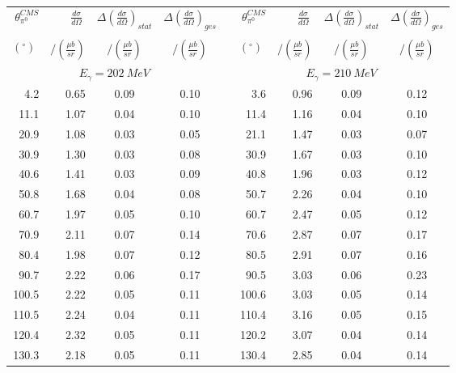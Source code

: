 \begin{table}[htbp] 
\begin{center} 
\begin{tabular}{|r|r|c|c|l|r|r|c|c|} 

\cline{1-4}
\cline{6-9} 
$\theta_{\pi^0}^{CMS}$ & 
$\displaystyle\frac{d\sigma}{d\Omega}\;$ & 
${\Delta}\left( \frac{d\sigma}{d\Omega}\right)_{stat}$ & 
${\Delta}\left( \frac{d\sigma}{d\Omega}\right)_{ges}$ & & 
$\theta_{\pi^0}^{CMS}$ & 
$\displaystyle\frac{d\sigma}{d\Omega}\;$ & 
${\Delta}\left( \frac{d\sigma}{d\Omega}\right)_{stat}$ & 
${\Delta}\left( \frac{d\sigma}{d\Omega}\right)_{ges}$ \\ 
& & & & & & & &\\ 
 $(^{\circ})\;$ & $/(\frac{{\mu}b}{sr})$ & $/(\frac{{\mu}b}{sr})$ & $/(\frac{{\mu}b}{sr})$ & & $(^{\circ})\;$ & $/(\frac{{\mu}b}{sr})$ & $/(\frac{{\mu}b}{sr})$ & $/(\frac{{\mu}b}{sr})$ \\ 
\cline{1-4} 
\cline{6-9} 
\multicolumn{4}{|c|}{ $E_{\gamma}=202~MeV$} & & 
\multicolumn{4}{c|}{ $E_{\gamma}=210~MeV$} \\ 
\cline{1-4} 
\cline{6-9} 
  4.2 &  0.65 &  0.09 &  0.10 & &   3.6 &  0.96 &  0.09 &  0.12 \\ 
 11.1 &  1.07 &  0.04 &  0.10 & &  11.4 &  1.16 &  0.04 &  0.10 \\ 
 20.9 &  1.08 &  0.03 &  0.05 & &  21.1 &  1.47 &  0.03 &  0.07 \\ 
 30.9 &  1.30 &  0.03 &  0.08 & &  30.9 &  1.67 &  0.03 &  0.10 \\ 
 40.6 &  1.41 &  0.03 &  0.09 & &  40.8 &  1.96 &  0.03 &  0.12 \\ 
 50.8 &  1.68 &  0.04 &  0.08 & &  50.7 &  2.26 &  0.04 &  0.10 \\ 
 60.7 &  1.97 &  0.05 &  0.10 & &  60.7 &  2.47 &  0.05 &  0.12 \\ 
 70.9 &  2.11 &  0.07 &  0.14 & &  70.6 &  2.87 &  0.07 &  0.17 \\ 
 80.4 &  1.98 &  0.07 &  0.12 & &  80.5 &  2.91 &  0.07 &  0.16 \\ 
 90.7 &  2.22 &  0.06 &  0.17 & &  90.5 &  3.03 &  0.06 &  0.23 \\ 
100.5 &  2.22 &  0.05 &  0.11 & & 100.6 &  3.03 &  0.05 &  0.14 \\ 
110.5 &  2.24 &  0.04 &  0.11 & & 110.4 &  3.16 &  0.05 &  0.15 \\ 
120.4 &  2.32 &  0.05 &  0.11 & & 120.2 &  3.07 &  0.04 &  0.14 \\ 
130.3 &  2.18 &  0.05 &  0.11 & & 130.4 &  2.85 &  0.04 &  0.14 \\ 

\end{tabular}
\end{center}
\end{table}
